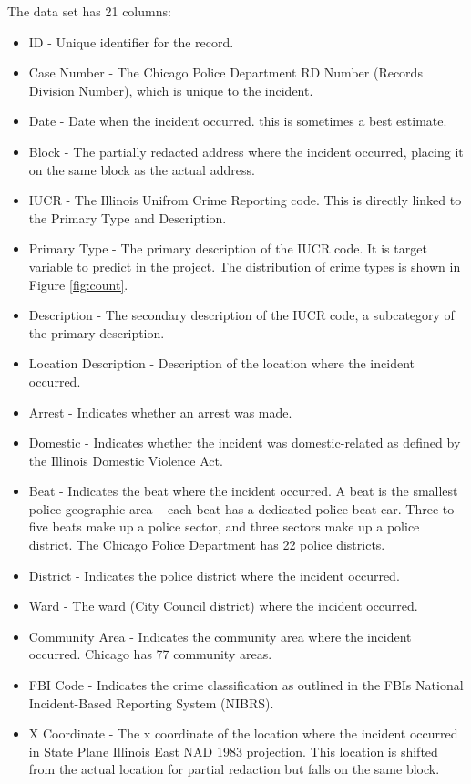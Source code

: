 \documentclass[12pt]{article}
\begin{document}
The data set has 21 columns:
\begin{itemize}
\item ID - Unique identifier for the record.
\item Case Number - The Chicago Police Department RD Number (Records Division Number), which is unique to the incident.
\item Date - Date when the incident occurred. this is sometimes a best estimate.
\item Block - The partially redacted address where the incident occurred, placing it on the same block as the actual address.
\item IUCR - The Illinois Unifrom Crime Reporting code. This is directly linked to the Primary Type and Description.
\item Primary Type - The primary description of the IUCR code. It is target variable to predict in the project. The distribution of crime types is shown in Figure \ref{fig:count}.
\item Description - The secondary description of the IUCR code, a subcategory of the primary description.
\item Location Description - Description of the location where the incident occurred.
\item Arrest - Indicates whether an arrest was made.
\item Domestic - Indicates whether the incident was domestic-related as defined by the Illinois Domestic Violence Act.
\item Beat - Indicates the beat where the incident occurred. A beat is the smallest police geographic area – each beat has a dedicated police beat car. Three to five beats make up a police sector, and three sectors make up a police district. The Chicago Police Department has 22 police districts.
\item District - Indicates the police district where the incident occurred.
\item Ward - The ward (City Council district) where the incident occurred.
\item Community Area - Indicates the community area where the incident occurred. Chicago has 77 community areas.
\item FBI Code - Indicates the crime classification as outlined in the FBIs National Incident-Based Reporting System (NIBRS).
\item X Coordinate - The x coordinate of the location where the incident occurred in State Plane Illinois East NAD 1983 projection. This location is shifted from the actual location for partial redaction but falls on the same block.

\end{itemize}
\end{document}
